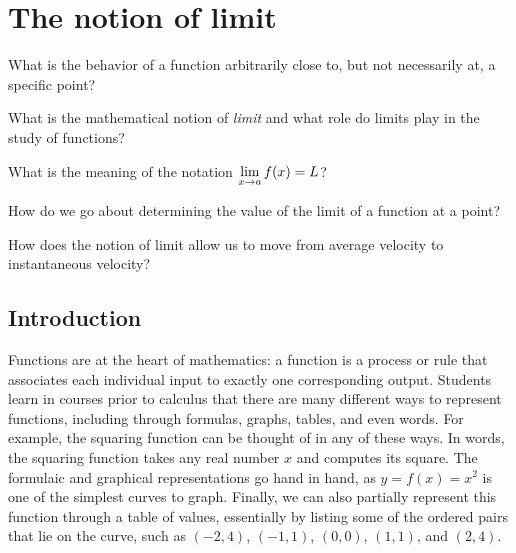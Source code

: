 \section{The notion of limit} \label{S:1.1.Limits}

\begin{goals}
\item What is the behavior of a function arbitrarily close to, but not necessarily at, a specific point?
\item What is the mathematical notion of \emph{limit} and what role do limits play in the study of functions?
\item What is the meaning of the notation $\displaystyle \lim_{x \to a} f(x) = L$?
\item How do we go about determining the value of the limit of a function at a point?
\item How does the notion of limit allow us to move from average velocity to instantaneous velocity?
\end{goals}

\subsection*{Introduction}

Functions are at the heart of mathematics: a function is a process or rule that associates each individual input to exactly one corresponding output.  Students learn in courses prior to calculus that there are many different ways to represent functions, including through formulas, graphs, tables, and even words.  For example, the squaring function can be thought of in any of these ways.  In words, the squaring function takes any real number $x$ and computes its square.  The formulaic and graphical representations go hand in hand, as $y = f(x) = x^2$ is one of the simplest curves to graph.  Finally, we can also partially represent this function through a table of values, essentially by listing some of the ordered pairs that lie on the curve, such as  $(-2,4)$, $(-1,1)$, $(0,0)$, $(1,1)$, and $(2,4)$.

